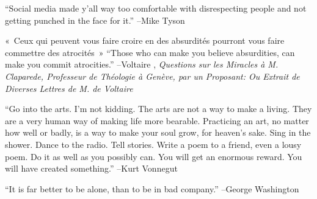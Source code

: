 \documentclass{article}%
\begin{document}
\linebreak%
\vspace{1mm}%
\begin{minipage}{\textwidth}%
\flushleft%
“Social media made y'all way too comfortable with disrespecting people and not getting punched in the face for it.”%
\linebreak%
\vspace{1mm}%
–Mike Tyson%
\linebreak%
\vspace{1mm}%
\end{minipage}%
\linebreak%
\vspace{1mm}%
\begin{minipage}{\textwidth}%
\flushleft%
«~Ceux qui peuvent vous faire croire en des absurdités pourront vous faire commettre des atrocités~»%
\linebreak%
\vspace{1mm}%
“Those who can make you believe absurdities, can make you commit atrocities.”%
\linebreak%
–Voltaire%
, \textit{Questions sur les Miracles à M. Claparede, Professeur de Théologie à Genève, par un Proposant: Ou Extrait de Diverses Lettres de M. de Voltaire}%
\linebreak%
\vspace{1mm}%
\end{minipage}%
\linebreak%
\vspace{1mm}%
\begin{minipage}{\textwidth}%
\flushleft%
“Go into the arts. I'm not kidding. The arts are not a way to make a living. They are a very human way of making life more bearable. Practicing an art, no matter how well or badly, is a way to make your soul grow, for heaven's sake. Sing in the shower. Dance to the radio. Tell stories. Write a poem to a friend, even a lousy poem. Do it as well as you possibly can. You will get an enormous reward. You will have created something.”%
\linebreak%
\vspace{1mm}%
–Kurt Vonnegut%
\linebreak%
\vspace{1mm}%
\end{minipage}%
\linebreak%
\vspace{1mm}%
\begin{minipage}{\textwidth}%
\flushleft%
“It is far better to be alone, than to be in bad company.”%
\linebreak%
\vspace{1mm}%
–George Washington%
\linebreak%
\vspace{1mm}%
\end{minipage}%
\end{document}
